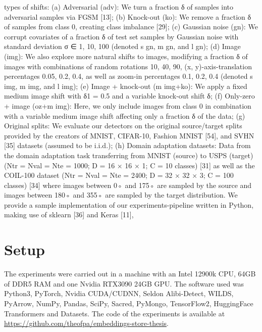 \documentclass[12pt]{report}
\begin{document}
types of shifts: (a) Adversarial (adv): We turn a fraction δ of samples into adversarial samples via FGSM [13]; (b) Knock-out (ko): We remove a fraction δ of samples from class 0, creating class imbalance [29]; (c) Gaussian noise (gn): We corrupt covariates of a fraction δ of test set samples by Gaussian noise with standard deviation σ ∈ {1, 10, 100} (denoted s gn, m gn, and l gn); (d) Image (img): We also explore more natural shifts to images, modifying a fraction δ of images with combinations of random rotations {10, 40, 90}, (x, y)-axis-translation percentages {0.05, 0.2, 0.4}, as well as zoom-in percentages {0.1, 0.2, 0.4} (denoted s img, m img, and l img); (e) Image + knock-out (m img+ko): We apply a fixed medium image shift with δ1 = 0.5 and a variable knock-out shift δ; (f) Only-zero + image (oz+m img): Here, we only include images from class 0 in combination with a variable medium image shift affecting only a fraction δ of the data; (g) Original splits: We evaluate our detectors on the original source/target splits provided by the creators of MNIST, CIFAR-10, Fashion MNIST [54], and SVHN [35] datasets (assumed to be i.i.d.); (h) Domain adaptation datasets: Data from the domain adaptation task transferring from MNIST (source) to USPS (target) (Ntr = Nval = Nte = 1000; D = 16 × 16 × 1; C = 10 classes) [31] as well as the COIL-100 dataset (Ntr = Nval = Nte = 2400; D = 32 × 32 × 3; C = 100 classes) [34] where images between 0◦ and 175◦ are sampled by the source and images between 180◦ and 355◦ are sampled by the target distribution. We provide a sample implementation of our experiments-pipeline written in Python, making use of sklearn [36] and Keras [11],

%

\section{Setup}

The experiments were carried out in a machine with an Intel 12900k CPU, 64GB of DDR5 RAM and one Nvidia RTX3090 24GB GPU.
The software used was Python3, PyTorch, Nvidia CUDA/CUDNN, Seldon Alibi-Detect, WILDS, PyArrow, NumPy, Pandas, SciPy, Sacred, PyMongo, TensorFlow2, HuggingFace Transformers and Datasets.
The code of the experiments is available at \url{https://github.com/theofpa/embeddings-store-thesis}.
\end{document}
